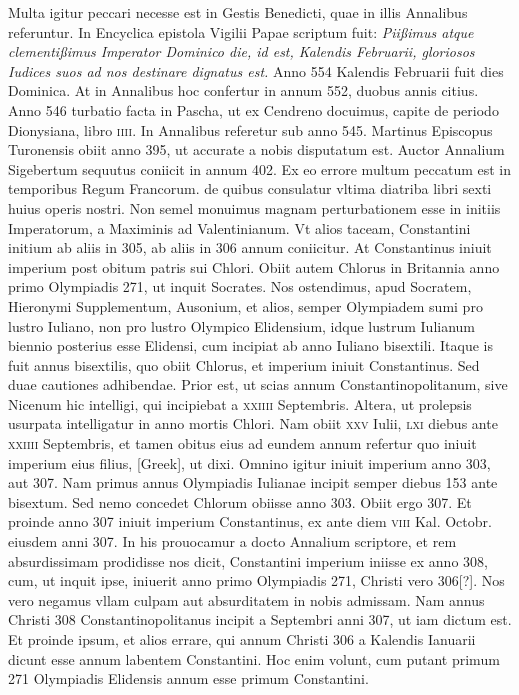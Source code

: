 Multa igitur peccari necesse est
in Gestis Benedicti, quae in illis Annalibus referuntur.
In Encyclica
epistola Vigilii Papae scriptum fuit: \textit{Piißimus atque clementißimus
Imperator Dominico die, id est, Kalendis Februarii, gloriosos Iudices suos
ad nos destinare dignatus est.}
Anno 554 Kalendis Februarii fuit dies
Dominica.
At in Annalibus hoc confertur in annum 552, duobus
annis citius.
Anno 546 turbatio facta in Pascha, ut ex Cendreno docuimus,
capite de periodo Dionysiana, libro \textsc{iiii}.
In Annalibus referetur
sub anno 545.
Martinus Episcopus Turonensis obiit anno
395, ut accurate a nobis disputatum est.
Auctor Annalium Sigebertum
sequutus coniicit in annum 402.
Ex eo errore multum peccatum
est in temporibus Regum Francorum.
de quibus consulatur vltima
diatriba libri sexti huius operis nostri.
Non semel monuimus magnam
perturbationem esse in initiis Imperatorum, a Maximinis
ad Valentinianum.
Vt alios taceam, Constantini initium ab aliis in
305, ab aliis in 306 annum coniicitur.
At Constantinus iniuit imperium
post obitum patris sui Chlori.
Obiit autem Chlorus in Britannia
anno primo Olympiadis 271, ut inquit Socrates.
Nos ostendimus,
apud Socratem, Hieronymi Supplementum, Ausonium, et alios,
semper Olympiadem sumi pro lustro Iuliano, non pro lustro Olympico
Elidensium, idque lustrum Iulianum biennio posterius esse Elidensi,
cum incipiat ab anno Iuliano bisextili.
Itaque is fuit annus bisextilis,
quo obiit Chlorus, et imperium iniuit Constantinus.
Sed duae
cautiones adhibendae.
Prior est, ut scias annum Constantinopolitanum,
sive Nicenum hic intelligi, qui incipiebat a \textsc{xxiiii} Septembris.
Altera, ut prolepsis usurpata intelligatur in anno mortis Chlori.
Nam obiit \textsc{xxv} Iulii, \textsc{lxi} diebus ante
\textsc{xxiiii} Septembris, et
tamen obitus eius ad eundem annum refertur quo iniuit imperium
eius filius, \textgreek{[Greek]}, ut dixi.
Omnino igitur iniuit imperium anno
303, aut 307.
Nam primus annus Olympiadis Iulianae incipit semper
diebus 153 ante bisextum.
Sed nemo concedet Chlorum obiisse
anno 303.
Obiit ergo 307.
Et proinde anno 307 iniuit imperium
Constantinus, ex ante diem \textsc{viii} Kal. Octobr. eiusdem anni 307.
In his prouocamur a docto Annalium scriptore, et rem absurdissimam
prodidisse nos dicit, Constantini imperium iniisse ex anno
308, cum, ut inquit ipse, iniuerit anno primo Olympiadis 271,
Christi vero 306[?].
Nos vero negamus vllam culpam aut absurditatem
in nobis admissam.
Nam annus Christi 308 Constantinopolitanus
incipit a Septembri anni 307, ut iam dictum est.
Et proinde ipsum, et alios errare, qui annum Christi 306 a
 Kalendis Ianuarii
dicunt esse annum labentem Constantini.
Hoc enim volunt,
cum putant primum 271 Olympiadis Elidensis annum esse primum
Constantini.

